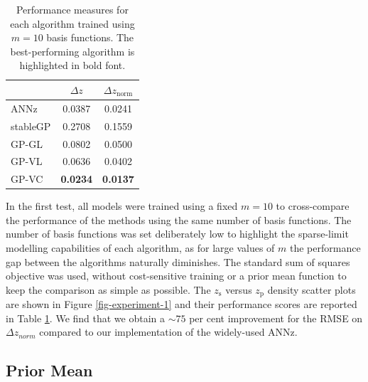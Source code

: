 \documentclass[useAMS,usenatbib,fleqn]{mn2e}
\begin{document}
 \begin{table}
\caption{Performance measures for each algorithm trained using $m=10$ basis functions. The best-performing algorithm is highlighted in bold font.}
\begin{center}
  \begin{tabular}{| l | c | c | }
     				&	$\Delta z$	&	$\Delta z_\textrm{norm}$	\\	\hline
	ANNz		&	0.0387			&	0.0241				\\
	stableGP		&	0.2708			&	0.1559				\\
	GP-GL		&	0.0802			&	0.0500				\\
	GP-VL		&	0.0636			&	0.0402				\\
	GP-VC		&	\textbf{0.0234}		&	\textbf{0.0137}			\\	\hline
  \end{tabular}
  \label{table-experiment-1}
\end{center}
\end{table}


In the first test, all models were trained using a fixed $m=10$ to cross-compare the performance of the methods using the same number of basis functions. The number of basis functions was set deliberately low to highlight the sparse-limit modelling capabilities of each algorithm, as for large values of $m$ the performance gap between the algorithms naturally diminishes. The standard sum of squares objective was used, without cost-sensitive training or a prior mean function to keep the comparison as simple as possible. The $z_\textrm{s}$ versus $z_\textrm{p}$ density scatter plots are shown in Figure \ref{fig-experiment-1} and their performance scores are reported in Table \ref{table-experiment-1}. We find that we obtain a $\sim 75$ per cent improvement for the RMSE on $\Delta z_{norm}$ compared to our implementation of the widely-used ANNz.

\subsection{Prior Mean}
\end{document}
